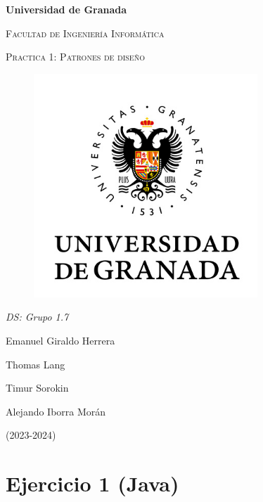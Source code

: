 \documentclass{article}
\begin{document}
	\begin{titlepage}
		\centering
		{\bfseries\LARGE Universidad de Granada\par}
		\vspace{1cm}
		{\scshape\Large Facultad de Ingeniería Informática \par}
		\vspace{2cm}
		{\scshape\Huge Practica 1: Patrones de diseño \par}
		\begin{figure}[h]
            	\centering
            	\includegraphics[width=0.75\textwidth]{logo_UGR.jpg}
            	\label{fig:portada}
            \end{figure}
		{\itshape\Large DS: Grupo 1.7\par}
		\vfill
			{\Large  Emanuel Giraldo Herrera\par}
			{\Large  Thomas Lang \par}
			{\Large  Timur Sorokin \par}
			{\Large  Alejando Iborra Morán \par}
		\vfill
		{\Large (2023-2024) \par}
	\end{titlepage}
	
	\section{Ejercicio 1 (Java)}
\end{document}
